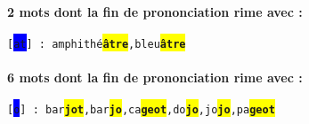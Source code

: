 \documentclass[french]{article}
\begin{document}
\paragraph{2 mots dont la fin de prononciation rime avec :\\}
\texttt{[\colorbox{blue}{at{\textipa{\textinvscr}}}] : amphithé\colorbox{yellow}{\textbf{âtre}},bleu\colorbox{yellow}{\textbf{âtre}}}\\
\paragraph{6 mots dont la fin de prononciation rime avec :\\}
\texttt{[\colorbox{blue}{\textipa{\textyogh}o}] : bar\colorbox{yellow}{\textbf{jot}},bar\colorbox{yellow}{\textbf{jo}},ca\colorbox{yellow}{\textbf{geot}},do\colorbox{yellow}{\textbf{jo}},jo\colorbox{yellow}{\textbf{jo}},pa\colorbox{yellow}{\textbf{geot}}}\\
\newpage
\end{document}
